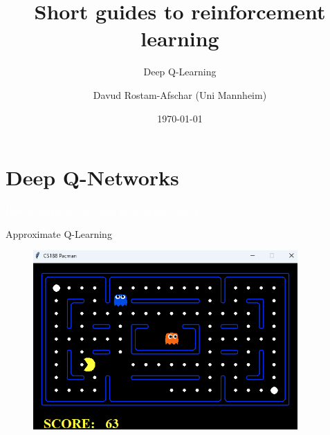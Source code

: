\documentclass[11pt,table]{beamer}
\title[]{Short guides to reinforcement learning}
\subtitle[]{Deep Q-Learning}
\author[D. Rostam-Afschar]{\textcolor{gray1}{Davud Rostam-Afschar (Uni Mannheim)}}
\date[]{\today}
\begin{document}
\begin{frame}[plain]
  \titlepage
\end{frame}


\section{Deep Q-Networks}
{
\begin{frame}
\centering
\Huge
\textcolor{white}{How to learn in very large state-action spaces?}
\thispagestyle{empty}
\end{frame}
}



\begin{frame}{Approximate Q-Learning}
\begin{figure}
	\centering
		\includegraphics[width=0.90\textwidth]{figures/pacman.png}
	\label{fig:pacman}
\end{figure}

\end{frame}
\end{document}
